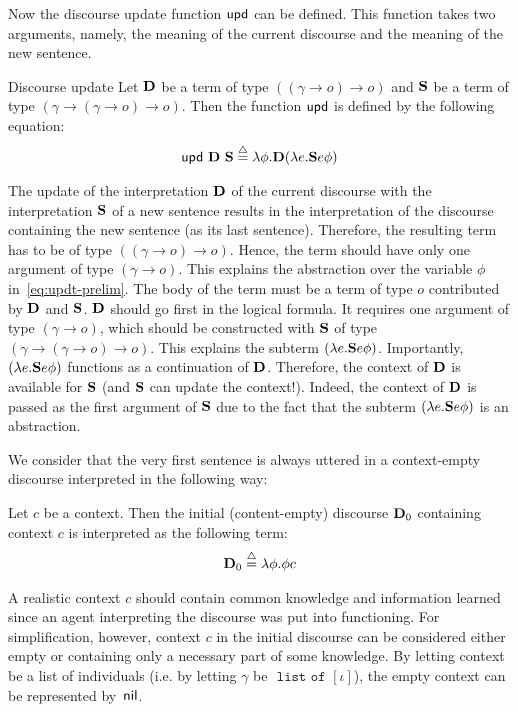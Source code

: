 Now the discourse update function $\updt$ can be defined. This function takes two arguments, namely, the meaning of the current discourse and the meaning of the new sentence.
\begin{definition}{Discourse update} Let $\D$ be a term of type $( (\gamma \rightarrow o) \rightarrow o)$ and $\S$ be a term of type $(\gamma \rightarrow (\gamma \rightarrow o) \rightarrow o)$. Then the function $ \updt$ is defined by the following equation:
\begin{align} %
 \updt \ \D \ \S \defeq  \lambda \phi.   \D (\lambda e. \S e \phi) \label{eq:updt}
\end{align} \label{def:updt-prelim}
\end{definition}
The update of the interpretation $\D$ of the current discourse with the interpretation $\S$ of a new sentence results in the interpretation of the discourse containing the new sentence (as its last sentence). Therefore, the resulting term has to be of type $((\gamma \rightarrow o) \rightarrow o)$. Hence, the term should have only one argument of type $(\gamma \rightarrow o)$. This explains the abstraction over the variable $\phi$ in~\eqref{eq:updt-prelim}. The body of the term must be a term of type $o$ contributed by $\D$ and $\S$. $\D$ should go first in the logical formula. It requires one argument of type $(\gamma \rightarrow o)$, which should be constructed with $\S$ of type $(\gamma \rightarrow (\gamma \rightarrow o) \rightarrow o)$. This explains the subterm $(\lambda e. \S e \phi) $. Importantly, $(\lambda e. \S e \phi) $ functions as a continuation of $\D$. Therefore, the context of $\D$ is available for $\S$ (and $\S$ can update the context!). Indeed, the context of $\D$ is passed as the first argument of $\S$ due to the fact that the subterm $(\lambda e. \S e \phi) $ is an abstraction.

We consider that the very first sentence is always uttered in a context-empty discourse interpreted in the following way:
\begin{definition} Let $c$ be a context. Then the initial (content-empty) discourse $\D_0$ containing context $c$ is interpreted as the following term:
\begin{align}
\D_0 \defeq \lambda \phi. \phi c \label{eq:D0}
\end{align}
\end{definition}

A realistic context $c$ should contain common knowledge and information learned since an agent interpreting the discourse was put into functioning. For simplification, however, context $c$ in the initial discourse can be considered either empty or containing only a necessary part of some knowledge. By letting context be a list of individuals (i.e. by letting $\gamma$ be $\texttt{ list of } [  \iota  ]$), the empty context can be represented by~$\nil$.

